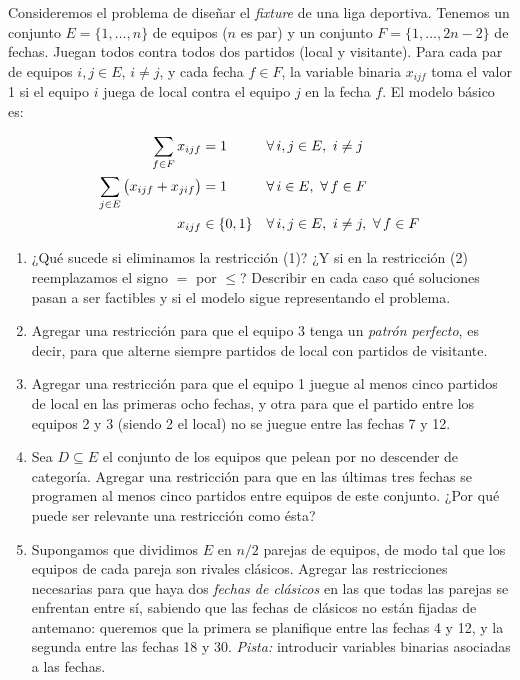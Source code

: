 \documentclass[11pt,a4paper]{article}
\begin{document}

Consideremos el problema de diseñar el \emph{fixture} de una liga deportiva.
Tenemos un conjunto $E = \{1,\dots,n\}$ de equipos ($n$ es par) y un conjunto
$F = \{1,\dots,2n-2\}$ de fechas. Juegan todos contra todos dos partidos (local
y visitante). Para cada par de equipos $i,j \in E$, $i \neq j$, y cada fecha
$f \in F$, la variable binaria $x_{ijf}$ toma el valor 1 si el equipo $i$ juega
de local contra el equipo $j$ en la fecha $f$. El modelo básico es:

\begin{align}
\sum_{f \in F} x_{ijf} &= 1 && \forall\, i,j \in E,\ i \neq j \\
\sum_{j \in E} \big( x_{ijf} + x_{jif} \big) &= 1 && \forall\, i \in E,\ \forall\, f \in F \\
x_{ijf} &\in \{0,1\} && \forall\, i,j \in E,\ i \neq j,\ \forall\, f \in F \notag
\end{align}

\begin{enumerate}
  \item ¿Qué sucede si eliminamos la restricción (1)? ¿Y si en la restricción
  (2) reemplazamos el signo $=$ por $\le$? Describir en cada caso qué soluciones
  pasan a ser factibles y si el modelo sigue representando el problema.

  \item Agregar una restricción para que el equipo 3 tenga un \emph{patrón
  perfecto}, es decir, para que alterne siempre partidos de local con partidos
  de visitante.

  \item Agregar una restricción para que el equipo 1 juegue al menos cinco
  partidos de local en las primeras ocho fechas, y otra para que el partido
  entre los equipos 2 y 3 (siendo 2 el local) no se juegue entre las fechas 7 y
  12.

  \item Sea $D \subseteq E$ el conjunto de los equipos que pelean por no
  descender de categoría. Agregar una restricción para que en las últimas tres
  fechas se programen al menos cinco partidos entre equipos de este conjunto.
  ¿Por qué puede ser relevante una restricción como ésta?

  \item Supongamos que dividimos $E$ en $n/2$ parejas de equipos, de modo tal
  que los equipos de cada pareja son rivales clásicos. Agregar las restricciones
  necesarias para que haya dos \emph{fechas de clásicos} en las que todas las
  parejas se enfrentan entre sí, sabiendo que las fechas de clásicos no están
  fijadas de antemano: queremos que la primera se planifique entre las fechas 4
  y 12, y la segunda entre las fechas 18 y 30. \emph{Pista:} introducir
  variables binarias asociadas a las fechas.
\end{enumerate}
\end{document}
